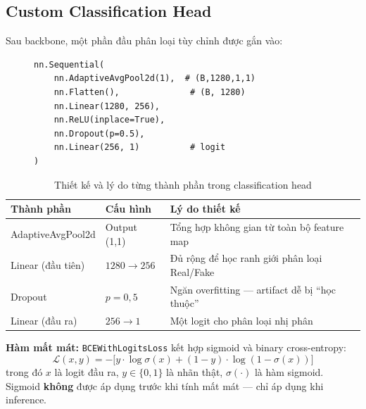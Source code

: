 \subsection{Custom Classification Head}

Sau backbone, một phần đầu phân loại tùy chỉnh được gắn vào:

\begin{figure}[H]
  \centering
  \begin{minipage}{0.55\linewidth}
    \begin{lstlisting}[style=python, caption={Kiến trúc classification head}]
nn.Sequential(
    nn.AdaptiveAvgPool2d(1),  # (B,1280,1,1)
    nn.Flatten(),              # (B, 1280)
    nn.Linear(1280, 256),
    nn.ReLU(inplace=True),
    nn.Dropout(p=0.5),
    nn.Linear(256, 1)          # logit
)
    \end{lstlisting}
  \end{minipage}
\end{figure}

\begin{table}[H]
  \centering
  \caption{Thiết kế và lý do từng thành phần trong classification head}
  \label{tab:head}
  \begin{tabularx}{\linewidth}{llX}
    \toprule
    \textbf{Thành phần} & \textbf{Cấu hình} & \textbf{Lý do thiết kế} \\
    \midrule
    AdaptiveAvgPool2d & Output (1,1) & Tổng hợp không gian từ toàn bộ feature map \\
    Linear (đầu tiên) & $1280 \to 256$ & Đủ rộng để học ranh giới phân loại Real/Fake \\
    Dropout           & $p = 0{,}5$   & Ngăn overfitting --- artifact dễ bị ``học thuộc'' \\
    Linear (đầu ra)   & $256 \to 1$   & Một logit cho phân loại nhị phân \\
    \bottomrule
  \end{tabularx}
\end{table}

\textbf{Hàm mất mát:} \texttt{BCEWithLogitsLoss} kết hợp sigmoid và binary cross-entropy:
\begin{equation}
  \mathcal{L}(x, y) = -\bigl[ y \cdot \log\sigma(x) + (1-y) \cdot \log(1 - \sigma(x)) \bigr]
  \label{eq:bce}
\end{equation}
trong đó $x$ là logit đầu ra, $y \in \{0, 1\}$ là nhãn thật, $\sigma(\cdot)$ là hàm sigmoid. Sigmoid \textbf{không} được áp dụng trước khi tính mất mát --- chỉ áp dụng khi inference.

